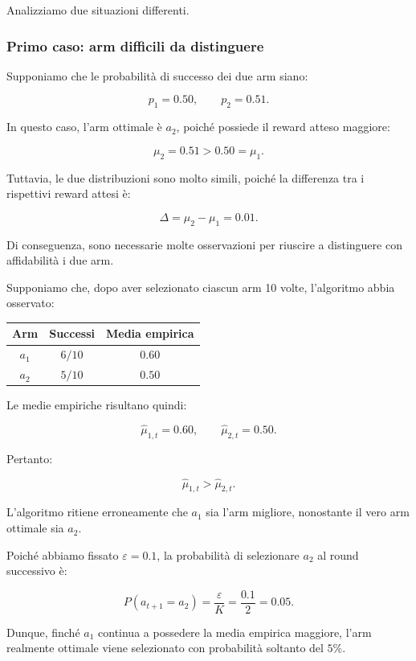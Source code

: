 Analizziamo due situazioni differenti.

\subsubsection{Primo caso: arm difficili da distinguere}

Supponiamo che le probabilità di successo dei due arm siano:

\[
p_1=0.50,
\qquad
p_2=0.51.
\]

In questo caso, l'arm ottimale è $a_2$, poiché possiede il reward atteso
maggiore:

\[
\mu_2=0.51>0.50=\mu_1.
\]

Tuttavia, le due distribuzioni sono molto simili, poiché la differenza
tra i rispettivi reward attesi è:

\[
\Delta=\mu_2-\mu_1=0.01.
\]

Di conseguenza, sono necessarie molte osservazioni per riuscire a
distinguere con affidabilità i due arm.

Supponiamo che, dopo aver selezionato ciascun arm 10 volte,
l'algoritmo abbia osservato:

\begin{center}
\begin{tabular}{|c|c|c|}
\hline
\textbf{Arm} & \textbf{Successi} & \textbf{Media empirica} \\
\hline
$a_1$ & $6/10$ & $0.60$ \\
\hline
$a_2$ & $5/10$ & $0.50$ \\
\hline
\end{tabular}
\end{center}

Le medie empiriche risultano quindi:

\[
\hat{\mu}_{1,t}=0.60,
\qquad
\hat{\mu}_{2,t}=0.50.
\]

Pertanto:

\[
\hat{\mu}_{1,t}>\hat{\mu}_{2,t}.
\]

L'algoritmo ritiene erroneamente che $a_1$ sia l'arm migliore,
nonostante il vero arm ottimale sia $a_2$.

Poiché abbiamo fissato $\varepsilon=0.1$, la probabilità di
selezionare $a_2$ al round successivo è:

\[
P(a_{t+1}=a_2)
=
\frac{\varepsilon}{K}
=
\frac{0.1}{2}
=
0.05.
\]

Dunque, finché $a_1$ continua a possedere la media empirica maggiore,
l'arm realmente ottimale viene selezionato con probabilità soltanto del $5\%$.


